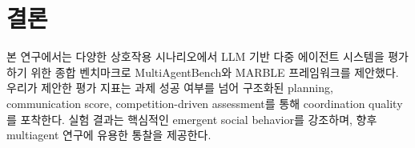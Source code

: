 \section{결론}
본 연구에서는 다양한 상호작용 시나리오에서 LLM 기반 다중 에이전트 시스템을 평가하기 위한 종합 벤치마크로 MultiAgentBench와 MARBLE 프레임워크를 제안했다. 우리가 제안한 평가 지표는 과제 성공 여부를 넘어 구조화된 planning, communication score, competition-driven assessment를 통해 coordination quality를 포착한다. 실험 결과는 핵심적인 emergent social behavior를 강조하며, 향후 multiagent 연구에 유용한 통찰을 제공한다.
